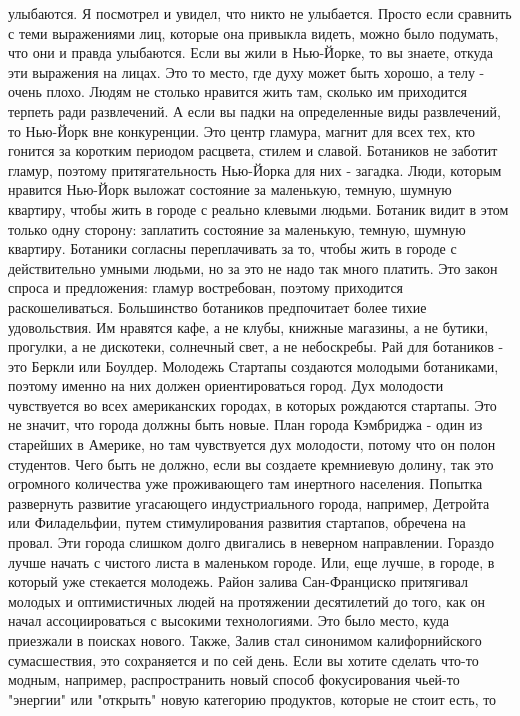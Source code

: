 \documentclass[ebook,12pt,oneside,openany]{memoir}
\begin{document}
улыбаются. Я посмотрел и увидел, что никто не улыбается. Просто если
сравнить с теми выражениями лиц, которые она привыкла видеть, можно
было подумать, что они и правда улыбаются. Если вы жили в Нью-Йорке,
то вы знаете, откуда эти выражения на лицах. Это то место, где духу
может быть хорошо, а телу - очень плохо. Людям не столько нравится
жить там, сколько им приходится терпеть ради развлечений. А если вы
падки на определенные виды развлечений, то Нью-Йорк вне конкуренции.
Это центр гламура, магнит для всех тех, кто гонится за коротким
периодом расцвета, стилем и славой. Ботаников не заботит гламур,
поэтому притягательность Нью-Йорка для них - загадка. Люди, которым
нравится Нью-Йорк выложат состояние за маленькую, темную, шумную
квартиру, чтобы жить в городе с реально клевыми людьми. Ботаник видит
в этом только одну сторону: заплатить состояние за маленькую, темную,
шумную квартиру. Ботаники согласны переплачивать за то, чтобы жить в
городе с действительно умными людьми, но за это не надо так много
платить. Это закон спроса и предложения: гламур востребован, поэтому
приходится раскошеливаться. Большинство ботаников предпочитает более
тихие удовольствия. Им нравятся кафе, а не клубы, книжные магазины, а
не бутики, прогулки, а не дискотеки, солнечный свет, а не небоскребы.
Рай для ботаников - это Беркли или Боулдер. Молодежь Стартапы
создаются молодыми ботаниками, поэтому именно на них должен
ориентироваться город. Дух молодости чувствуется во всех американских
городах, в которых рождаются стартапы. Это не значит, что города
должны быть новые. План города Кэмбриджа - один из старейших в
Америке, но там чувствуется дух молодости, потому что он полон
студентов. Чего быть не должно, если вы создаете кремниевую долину,
так это огромного количества уже проживающего там инертного населения.
Попытка развернуть развитие угасающего индустриального города,
например, Детройта или Филадельфии, путем стимулирования развития
стартапов, обречена на провал. Эти города слишком долго двигались в
неверном направлении. Гораздо лучше начать с чистого листа в маленьком
городе. Или, еще лучше, в городе, в который уже стекается молодежь.
Район залива Сан-Франциско притягивал молодых и оптимистичных людей на
протяжении десятилетий до того, как он начал ассоциироваться с
высокими технологиями. Это было место, куда приезжали в поисках
нового. Также, Залив стал синонимом калифорнийского сумасшествия, это
сохраняется и по сей день. Если вы хотите сделать что-то модным,
например, распространить новый способ фокусирования чьей-то "энергии"
или "открыть" новую категорию продуктов, которые не стоит есть, то
\end{document}
